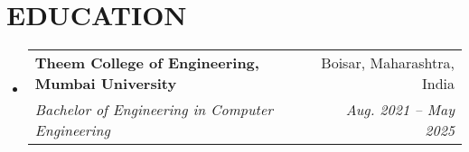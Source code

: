 \documentclass[letterpaper,11pt]{article}
\makeatletter
\newcommand{\resumeSubheading}[4]{%
  \vspace{-2pt}\item%
  \begin{tabular*}{0.97\textwidth}[t]{l@{\extracolsep{\fill}}r}%
    \textbf{#1} & #2 \\
    \textit{\small #3} & \textit{\small #4} \\
  \end{tabular*}\vspace{-7pt}%
}
\newcommand{\resumeSubHeadingListStart}{\begin{itemize}[leftmargin=0.15in, label={}]}
\newcommand{\resumeSubHeadingListEnd}{\end{itemize}}
\makeatother
\begin{document}
\section{EDUCATION}
  \resumeSubHeadingListStart
    \resumeSubheading
      {Theem College of Engineering, Mumbai University}{Boisar, Maharashtra, India}
      {Bachelor of Engineering in Computer Engineering}{Aug. 2021 -- May 2025}
  \resumeSubHeadingListEnd
\end{document}

